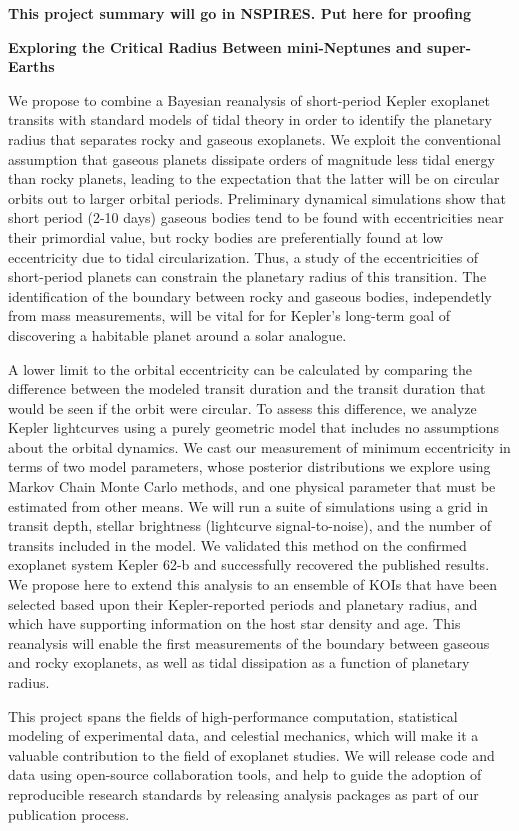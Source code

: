 \centerline{\bf This project summary will go in NSPIRES.  Put here for proofing} \medskip

\centerline{\bf Exploring the Critical Radius Between mini-Neptunes and super-Earths} \medskip

We propose to combine a Bayesian reanalysis of short-period Kepler
exoplanet transits with standard models of tidal theory in order to
identify the planetary radius that separates rocky and gaseous
exoplanets. We exploit the conventional assumption that gaseous
planets dissipate orders of magnitude less tidal energy than rocky
planets, leading to the expectation that the latter will be on
circular orbits out to larger orbital periods. Preliminary dynamical
simulations show that short period (2-10 days) gaseous bodies tend to
be found with eccentricities near their primordial value, but rocky
bodies are preferentially found at low eccentricity due to tidal
circularization.  Thus, a study of the eccentricities of short-period
planets can constrain the planetary radius of this transition.  The
identification of the boundary between rocky and gaseous bodies,
independetly from mass measurements, will be vital for for Kepler's
long-term goal of discovering a habitable planet around a solar
analogue.

A lower limit to the orbital eccentricity can be calculated by
comparing the difference between the modeled transit duration and the
transit duration that would be seen if the orbit were circular.  To
assess this difference, we analyze Kepler lightcurves using a purely
geometric model that includes no assumptions about the orbital
dynamics.  We cast our measurement of minimum eccentricity in terms of
two model parameters, whose posterior distributions we explore using
Markov Chain Monte Carlo methods, and one physical parameter that must
be estimated from other means.  We will run a suite of simulations
using a grid in transit depth, stellar brightness (lightcurve
signal-to-noise), and the number of transits included in the model.
%
%
We validated this method on the confirmed exoplanet system Kepler 62-b
and successfully recovered the published results. We propose here to
extend this analysis to an ensemble of KOIs that have been selected
based upon their Kepler-reported periods and planetary radius, and
which have supporting information on the host star density and age.
This reanalysis will enable the first measurements of the boundary
between gaseous and rocky exoplanets, as well as tidal dissipation as
a function of planetary radius.

This project spans the fields of high-performance computation,
statistical modeling of experimental data, and celestial mechanics,
which will make it a valuable contribution to the field of exoplanet
studies.  We will release code and data using open-source
collaboration tools, and help to guide the adoption of reproducible
research standards by releasing analysis packages as part of our
publication process.

